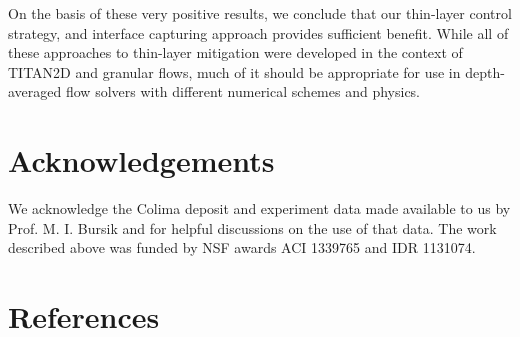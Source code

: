 \documentclass[review]{elsarticle}
\begin{document}
%
On the basis of these very positive results, we conclude that our 
thin-layer control strategy, and interface capturing approach provides sufficient benefit. 
While all of these approaches to thin-layer mitigation were developed in the 
context of TITAN2D and granular flows, much of it should be appropriate 
for use in depth-averaged flow solvers with different numerical 
schemes and physics.

\section*{Acknowledgements}
 We acknowledge the Colima deposit  and experiment data made available to us by Prof. M. I. Bursik and for helpful discussions on the use of that data. The 
 work described above was funded by NSF awards ACI 1339765 and IDR 1131074.

\section*{References}


\end{document}
